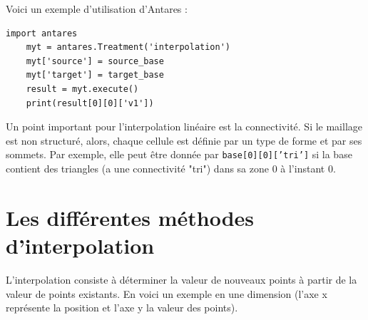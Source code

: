 Voici un exemple d'utilisation d'Antares :

\begin{lstlisting}[caption=Exemple simple d'utilisation d'Antares pour interpoler, label={lst:antares_2}]
    import antares
    myt = antares.Treatment('interpolation')
    myt['source'] = source_base
    myt['target'] = target_base
    result = myt.execute()
    print(result[0][0]['v1'])
\end{lstlisting}

Un point important pour l'interpolation linéaire est la connectivité. Si le maillage est non structuré, alors, chaque cellule est définie par un type de forme et par ses sommets. Par exemple, elle peut être donnée par \texttt{base[0][0]['tri']} si la base contient des triangles (a une connectivité "tri") dans sa zone 0 à l'instant 0.


\section{Les différentes méthodes d'interpolation}

L'interpolation consiste à déterminer la valeur de nouveaux points à partir de la valeur de points existants. En voici un exemple en une dimension (l'axe x représente la position et l'axe y la valeur des points).

\vspace{0,5cm}


\begin{center}
\end{center}

